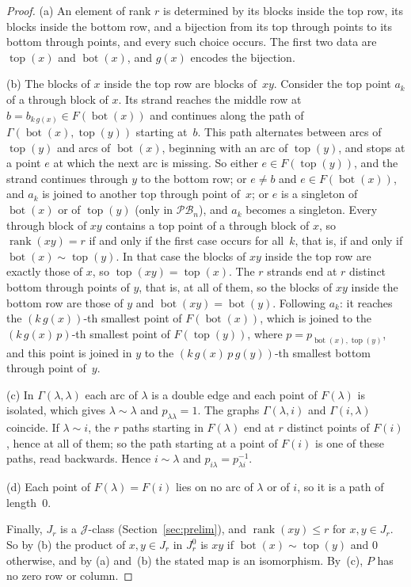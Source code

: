 \documentclass[11pt]{article}
\theoremstyle{remark}
\newcommand{\PB}{\mathcal{PB}}
\newcommand{\tp}{\operatorname{top}}
\newcommand{\bt}{\operatorname{bot}}
\newcommand{\rk}{\operatorname{rank}}
\begin{document}
\begin{proof}
(a) An element of rank $r$ is determined by its blocks inside the top row, its
blocks inside the bottom row, and a bijection from its top through points to
its bottom through points, and every such choice occurs. The first two data
are $\tp(x)$ and $\bt(x)$, and $g(x)$ encodes the bijection.

(b) The blocks of $x$ inside the top row are blocks of~$xy$. Consider the top
point $a_k$ of a through block of $x$. Its strand reaches the middle row at
$b=b_{k\,g(x)}\in F(\bt(x))$ and continues along the path of
$\Gamma(\bt(x),\tp(y))$ starting at~$b$. This path alternates between arcs of
$\tp(y)$ and arcs of $\bt(x)$, beginning with an arc of $\tp(y)$, and stops at
a point $e$ at which the next arc is missing. So either $e\in F(\tp(y))$, and
the strand continues through $y$ to the bottom row; or $e\ne b$ and $e\in
F(\bt(x))$, and $a_k$ is joined to another top through point of~$x$; or $e$ is
a singleton of $\bt(x)$ or of $\tp(y)$ (only in $\PB_n$), and $a_k$ becomes a
singleton. Every through block of $xy$ contains a top point of a through block
of $x$, so $\rk(xy)=r$ if and only if the first case occurs for all~$k$, that
is, if and only if $\bt(x)\sim\tp(y)$. In that case the blocks of $xy$ inside
the top row are exactly those of $x$, so $\tp(xy)=\tp(x)$. The $r$ strands end
at $r$ distinct bottom through points of $y$, that is, at all of them, so the
blocks of $xy$ inside the bottom row are those of $y$ and $\bt(xy)=\bt(y)$.
Following $a_k$: it reaches the $(k\,g(x))$-th smallest point of
$F(\bt(x))$, which is joined to the $(k\,g(x)\,p)$-th smallest point of
$F(\tp(y))$, where $p=p_{\bt(x),\tp(y)}$, and this point is joined in $y$ to
the $(k\,g(x)\,p\,g(y))$-th smallest bottom through point of~$y$.

(c) In $\Gamma(\lambda,\lambda)$ each arc of $\lambda$ is a double edge and each
point of $F(\lambda)$ is isolated, which gives $\lambda\sim\lambda$ and
$p_{\lambda\lambda}=1$. The graphs $\Gamma(\lambda,i)$ and $\Gamma(i,\lambda)$
coincide. If $\lambda\sim i$, the $r$ paths starting in $F(\lambda)$ end at $r$
distinct points of $F(i)$, hence at all of them; so the path starting at a
point of $F(i)$ is one of these paths, read backwards. Hence $i\sim\lambda$ and
$p_{i\lambda}=p_{\lambda i}^{-1}$.

(d) Each point of $F(\lambda)=F(i)$ lies on no arc of $\lambda$ or of $i$, so it
is a path of length~$0$.

Finally, $J_r$ is a $\mathcal J$-class (Section~\ref{sec:prelim}), and
$\rk(xy)\le r$ for $x,y\in J_r$. So by (b) the product of $x,y\in J_r$ in
$J_r^0$ is $xy$ if $\bt(x)\sim\tp(y)$ and $0$ otherwise, and by (a) and~(b)
the stated map is an isomorphism. By~(c), $P$ has no zero row or column.
\end{proof}
\end{document}
